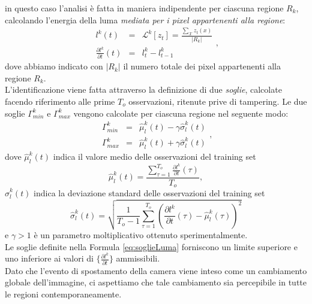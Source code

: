 in questo caso l'analisi \`e fatta in maniera indipendente per ciascuna regione $R_k$, calcolando l'energia della luma \textit{mediata per i pixel appartenenti alla regione}:
\begin{equation}
	\label{eq:lumaRegions}
	\begin{array}{ccc}
	l^k(t)&  = & \mathcal{L}^k[z_t] = \frac{\sum_{\mathcal{X}} z_t(x) }{|{R_k}|}\\
	\frac{\partial l^k}{\partial t}(t) & =& l_t^k-l_{t-1}^k 
	\end{array},
\end{equation}
dove abbiamo indicato con $|{R_k}|$ il numero totale dei pixel appartenenti alla regione $R_k$.\\
L'identificazione viene fatta attraverso la definizione di due \textit{soglie}, calcolate facendo riferimento alle prime $T_{o}$ osservazioni, ritenute prive di tampering.
Le due soglie $\Gamma_{min}^k$ e $\Gamma_{max}^k$ vengono calcolate per ciascuna regione nel seguente modo:
\begin{equation}
\label{eq:soglieLuma}
\begin{array}{rcl}
\Gamma_{min}^k & = & \hat{\mu}_l^k(t) -\gamma \hat{\sigma}_l^k(t)\\
\Gamma_{max}^k & = & \hat{\mu}_l^k(t) + \gamma \hat{\sigma}_l^k(t)
\end{array},
\end{equation}
dove $\hat{\mu}_l^k(t)$ indica il valore medio delle osservazioni del training set
\begin{equation}
\hat{\mu}_l^k(t) = \frac{\sum_{\tau = 1}^{T_{o}} \frac{\partial l^k}{\partial t}(\tau)}{T_{o}}, \nonumber
\end{equation}
$\hat{\sigma}_l^k(t)$ indica la deviazione standard delle osservazioni del training set
\begin{equation}
\hat{\sigma}_l^k(t)  = \sqrt{\frac{1}{T_{o}-1}\sum_{\tau=1}^{T_{o}}\left(\frac{\partial l^k}{\partial t}(\tau) - \hat{\mu}_l^k(\tau)\right)^2} \nonumber
\end{equation}
e $\gamma>1$ \`e un parametro moltiplicativo ottenuto sperimentalmente.\\
Le soglie definite nella Formula \eqref{eq:soglieLuma} forniscono un limite superiore e uno inferiore ai valori di $\{\frac{\partial l^k}{\partial t}\}$ ammissibili.\\
Dato che l'evento di spostamento della camera viene inteso come un cambiamento globale dell'immagine, ci aspettiamo che tale cambiamento sia percepibile in tutte le regioni contemporaneamente. 
